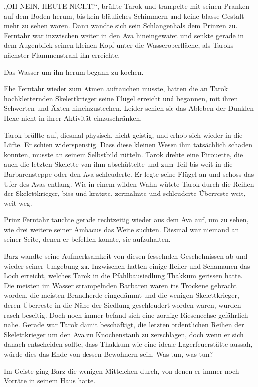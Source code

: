 „OH NEIN, HEUTE NICHT!“, brüllte Tarok und trampelte mit seinen Pranken auf dem Boden herum, bis kein bläuliches Schimmern und keine blasse Gestalt mehr zu sehen waren. Dann wandte sich sein Schlangenhals dem Prinzen zu. Ferntahr war inzwischen weiter in den Ava hineingewatet und senkte gerade in dem Augenblick seinen kleinen Kopf unter die Wasseroberfläche, als Taroks nächster Flammenstrahl ihn erreichte.

Das Wasser um ihn herum begann zu kochen.

Ehe Ferntahr wieder zum Atmen auftauchen musste, hatten die an Tarok hochkletternden Skelettkrieger seine Flügel erreicht und begannen, mit ihren Schwerten und Äxten hineinzustechen. Leider schien sie das Ableben der Dunklen Hexe nicht in ihrer Aktivität einzuschränken.

Tarok brüllte auf, diesmal physisch, nicht geistig, und erhob sich wieder in die Lüfte. Er schien widerspenstig. Dass diese kleinen Wesen ihm tatsächlich schaden konnten, musste an seinem Selbstbild rütteln. Tarok drehte eine Pirouette, die auch die letzten Skelette von ihm abschüttelte und zum Teil bis weit in die Barbarensteppe oder den Ava schleuderte. Er legte seine Flügel an und schoss das Ufer des Avas entlang. Wie in einem wilden Wahn wütete Tarok durch die Reihen der Skelettkrieger, biss und kratzte, zermalmte und schleuderte Überreste weit, weit weg.

Prinz Ferntahr tauchte gerade rechtzeitig wieder aus dem Ava auf, um zu sehen, wie drei weitere seiner Ambacus das Weite suchten. Diesmal war niemand an seiner Seite, denen er befehlen konnte, sie aufzuhalten.

Barz wandte seine Aufmerksamkeit von diesen fesselnden Geschehnissen ab und wieder seiner Umgebung zu. Inzwischen hatten einige Heiler und Schamanen das Loch erreicht, welches Tarok in die Pfahlbausiedlung Thakkum gerissen hatte. Die meisten im Wasser strampelnden Barbaren waren ins Trockene gebracht worden, die meisten Brandherde eingedämmt und die wenigen Skelettkrieger, deren Überreste in die Nähe der Siedlung geschleudert worden waren, wurden rasch beseitig. Doch noch immer befand sich eine zornige Riesenechse gefährlich nahe. Gerade war Tarok damit beschäftigt, die letzten ordentlichen Reihen der Skelettkrieger um den Ava zu Knochenstaub zu zerschlagen, doch wenn er sich danach entscheiden sollte, dass Thakkum wie eine ideale Lagerfeuerstätte aussah, würde dies das Ende von dessen Bewohnern sein. Was tun, was tun?

Im Geiste ging Barz die wenigen Mittelchen durch, von denen er immer noch Vorräte in seinem Haus hatte.

